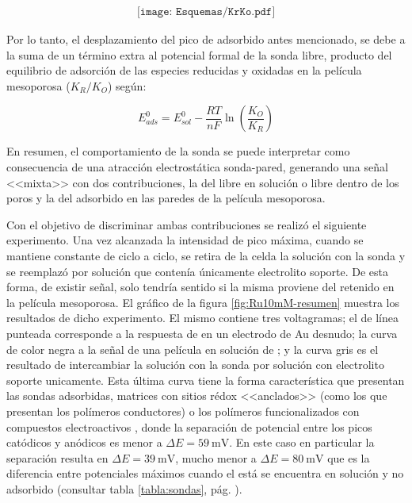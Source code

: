 				\begin{equation}
				\begin{aligned}
		 	    \texttt{[image: Esquemas/KrKo.pdf]}
		 	    \label{eq:ciclo}
		 	    \end{aligned}
		      	\end{equation}

		Por lo tanto, el desplazamiento del pico de \ru\space adsorbido antes mencionado, se debe a la suma de un término extra al potencial formal de la sonda libre, producto del equilibrio de adsorción de las especies reducidas y oxidadas en la película mesoporosa ($K_R/K_O$) según\cite{Wi2000}:

				\begin{equation}
				E^0_{ads} = E^0_{sol}-\frac{RT}{nF}\ln \left(\frac{K_O}{K_R}\right)
				\label{eq:kokreq}
				\end{equation}

		En resumen, el comportamiento de la sonda se puede interpretar como consecuencia de una atracción electrostática sonda-pared, generando una señal <<mixta>> con dos contribuciones, la del \ru\space libre en solución o libre dentro de los poros y la del \ru\space adsorbido en las paredes de la película mesoporosa.

		Con el objetivo de discriminar ambas contribuciones se realizó el siguiente experimento. Una vez alcanzada la intensidad de pico máxima, cuando se mantiene constante de ciclo a ciclo, se retira de la celda la solución con la sonda y se reemplazó por solución que contenía únicamente electrolito soporte. De esta forma, de existir señal, solo tendría sentido si la misma proviene del \ru\space retenido en la película mesoporosa. El gráfico de la figura \ref{fig:Ru10mM-resumen} muestra los resultados de dicho experimento. El mismo contiene tres voltagramas; el de línea punteada corresponde a la respuesta de \ru\space en un electrodo de Au desnudo; la curva de color negra a la señal de una película en solución de \ru; y la curva gris es el resultado de intercambiar la solución con la sonda por solución con electrolito soporte unicamente. Esta última curva tiene la forma característica que presentan las sondas adsorbidas, matrices con sitios rédox <<anclados>>\cite{ybarra2005,ybarra2007} (como los que presentan los polímeros conductores) o los polímeros funcionalizados con compuestos electroactivos \cite{Rohlfing2005,Vila2015}, donde la separación de potencial entre los picos catódicos y anódicos es menor a $\Delta E = \SI{59}{\milli\volt}$. En este caso en particular la separación resulta en $\Delta E = \SI{39}{\milli\volt}$, mucho menor a $\Delta E = \SI{80}{\milli\volt}$ que es la diferencia entre potenciales máximos cuando el \ru\space está se encuentra en solución y no adsorbido (consultar tabla \ref{tabla:sondas}, pág. \pageref{tabla:sondas})\cite{Wi2000}.

